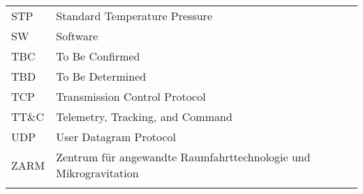 \begin{longtable}{p{3cm} p{9cm}}
             STP         & Standard Temperature Pressure\\
             SW          & Software\\
             TBC         & To Be Confirmed\\
             TBD         & To Be Determined \\
             TCP         & Transmission Control Protocol\\
             TT$\&$C     & Telemetry, Tracking, and Command\\
             UDP         & User Datagram Protocol\\
             ZARM        & Zentrum f{\"u}r angewandte Raumfahrttechnologie und Mikrogravitation \\
         \label{tab:abbrevi}
     \end{longtable}
     \raggedbottom
